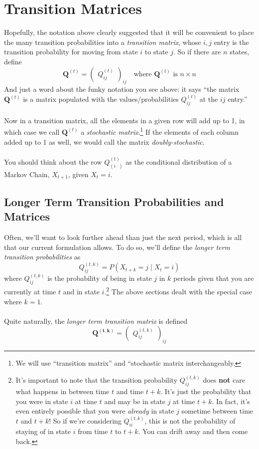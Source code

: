 \documentclass[12pt]{article}
\theoremstyle{plain}
\theoremstyle{definition}
\theoremstyle{remark}
\begin{document}
\newpage
\section{Transition Matrices}

Hopefully, the notation above clearly suggested that it will be
convenient to place the many transition probabilities into a
{\sl transition matrix}, whose $i,j$ entry is the transition
probability for moving from state $i$ to state $j$. So if 
there are $n$ states, define
\[\mathbf{Q}^{(t)}=\begin{pmatrix} Q_{ij}^{(t)} \end{pmatrix}_{ij}
    \quad \text{where $\mathbf{Q}^{(t)}$ is $n\times n$} \]
And just a word about the funky notation you see above: it says
``the matrix $\mathbf{Q}^{(t)}$ is a matrix populated
with the values/probabilities $Q_{ij}^{(t)}$ at the $ij$ 
entry.'' 
\\
\\
Now in a transition matrix, all the elements in a given row will add up
to 1, in which case we call $\mathbf{Q}^{(t)}$ a 
{\sl stochastic matrix}.\footnote{We will use 
``transition matrix'' and ``stochastic matrix interchangeably.}
If the elements of each column added up to 1 as well, we would call
the matrix {\sl doubly-stochastic}.
\\
\\
You should think about the row $Q_{(i\cdot)}^{(t)}$ as the 
conditional distribution of a Markov Chain, $X_{t+1}$, given
$X_t = i$.


\subsection{Longer Term Transition Probabilities and Matrices}

Often, we'll want to look further ahead than just the next period, which
is all that our current formulation allows. To do so, we'll define
the {\sl longer term transition probabilities} as 
\[ Q^{(t,k)}_{ij} = P(X_{t+k} = j \;|\; X_t = i ) \]
where $Q^{(t,k)}_{ij}$ is the probability of 
being in state $j$ in $k$ periods given that you are currently
at time $t$ and in state $i$.\footnote{It's important to note that the transition
    probability $Q^{(t,k)}_{ij}$ does \textbf{not} care what happens in between
    time $t$ and time $t+k$.  It's just the probability that you were in
    state $i$ at time $t$ and may be in state $j$ at time 
    $t+k$. In fact, it's even entirely possible 
    that you were \emph{already} in state $j$ sometime between
    time $t$ and $t+k$! So if we're considering $Q^{(t,k)}_{ii}$, 
    this is not the probability of staying of in state $i$
    from time $t$ to $t+k$.  You can drift away and then come back.}
The above sections dealt with the special case where $k=1$.
\\
\\
Quite naturally, the {\sl longer term transition matrix} is defined
\[\mathbf{Q^{(t,k)}} =
      \begin{pmatrix} Q^{(t,k)}_{ij} \end{pmatrix}_{ij}
      \]
\end{document}
